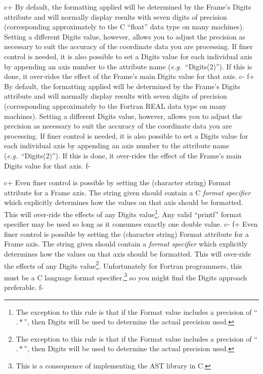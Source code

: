 \documentclass[twoside,11pt]{article}
\begin{document}
c+
By default, the formatting applied will be determined by the Frame's
Digits attribute and will normally display results with seven digits
of precision (corresponding approximately to the C ``float'' data type
on many machines). Setting a different Digits value, however, allows
you to adjust the precision as necessary to suit the accuracy of the
coordinate data you are processing.  If finer control is needed, it is
also possible to set a Digits value for each individual axis by
appending an axis number to the attribute name
({\em{e.g.}}\ ``Digits(2)''). If this is done, it over-rides the
effect of the Frame's main Digits value for that axis.
c-
f+
By default, the formatting applied will be determined by the Frame's
Digits attribute and will normally display results with seven digits
of precision (corresponding approximately to the Fortran REAL data
type on many machines). Setting a different Digits value, however,
allows you to adjust the precision as necessary to suit the accuracy
of the coordinate data you are processing.  If finer control is
needed, it is also possible to set a Digits value for each individual
axis by appending an axis number to the attribute name
({\em{e.g.}}\ ``Digits(2)''). If this is done, it over-rides the
effect of the Frame's main Digits value for that axis.
f-

c+
Even finer control is possible by setting the (character string) Format
attribute for a Frame axis. The string given should contain a C
{\em{format specifier}} which explicitly determines how the values on
that axis should be formatted. This will over-ride the effects of any
Digits value\footnote{The exception to this rule is that if the Format
value includes a precision of ``$.*$'', then Digits will be used to
determine the actual precision used.}. Any valid ``printf'' format
specifier may be used so long as it consumes exactly one double value.
c-
f+
Even finer control is possible by setting the (character string)
Format attribute for a Frame axis. The string given should contain a
{\em{format specifier}} which explicitly determines how the values on
that axis should be formatted. This will over-ride the effects of any
Digits value\footnote{The exception to this rule is that if the Format value
includes a precision of ``$.*$'', then Digits will be used to determine
the actual precision used.}.  Unfortunately for Fortran programmers, this must
be a C language format specifier,\footnote{This is a consequence of
implementing the AST library in C.} so you might find the Digits
approach preferable.
f-
\end{document}
